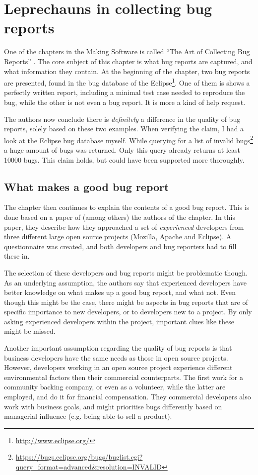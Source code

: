 \chapter{Leprechauns in collecting bug reports}
One of the chapters in the Making Software is called ``The Art of Collecting Bug Reports'' \cite{makingsoftware}.
The core subject of this chapter is what bug reports are captured, and what information they contain.
At the beginning of the chapter, two bug reports are presented, found in the bug database of the Eclipse\footnote{\url{http://www.eclipse.org/}}. 
One of them is shows a perfectly written report, including a minimal test case needed to reproduce the bug, while the other is not even a bug report.
It is more a kind of help request. 

The authors now conclude there is \emph{definitely} a difference in the quality of bug reports, solely based on these two examples.
When verifying the claim, I had a look at the Eclipse bug database myself. 
While querying for a list of invalid bugs\footnote{\url{https://bugs.eclipse.org/bugs/buglist.cgi?query_format=advanced&resolution=INVALID}} a huge amount of bugs was returned.
Only this query already returns at least 10000 bugs.
This claim holds, but could have been supported more thoroughly.

\section{What makes a good bug report}
The chapter then continues to explain the contents of a good bug report. 
This is done based on a paper \cite{Bettenburg:2008:MGB:1453101.1453146} of (among others) the authors of the chapter. 
In this paper, they describe how they approached a set of \emph{experienced} developers from three different large open source projects (Mozilla, Apache and Eclipse).
A questionnaire was created, and both developers and bug reporters had to fill these in.

The selection of these developers and bug reports might be problematic though. 
As an underlying assumption, the authors say that experienced developers have better knowledge on what makes up a good bug report, and what not. 
Even though this might be the case, there might be aspects in bug reports that are of specific importance to new developers, or to developers new to a project. 
By only asking experienced developers within the project, important clues like these might be missed.

Another important assumption regarding the quality of bug reports is that business developers have the same needs as those in open source projects.
However, developers working in an open source project experience different environmental factors then their commercial counterparts. 
The first work for a community backing company, or even as a volunteer, while the latter are employed, and do it for financial compensation. 
They commercial developers also work with business goals, and might prioritise bugs differently based on managerial influence (e.g. being able to sell a product).

